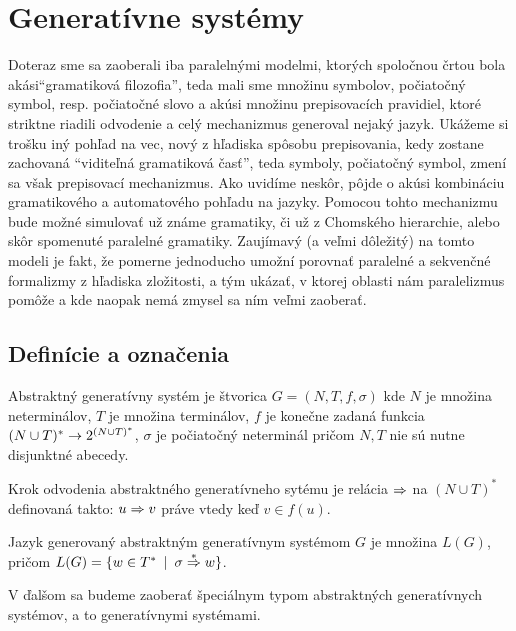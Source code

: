 \chapter{Generatívne systémy}

Doteraz sme sa zaoberali iba paralelnými modelmi, ktorých
spoločnou črtou bola akási\linebreak ``gramatiková filozofia'',
teda mali sme množinu symbolov, počiatočný symbol, resp.
počiatočné slovo a akúsi množinu prepisovacích pravidiel, ktoré
striktne riadili odvodenie a celý mechanizmus generoval nejaký
jazyk. Ukážeme si trošku iný pohľad na vec, nový z hľadiska
spôsobu prepisovania, kedy zostane zachovaná ``viditeľná
gramatiková časť'', teda symboly, počiatočný symbol, zmení sa však
prepisovací mechanizmus. Ako uvidíme neskôr, pôjde o akúsi
kombináciu gramatikového a automatového pohľadu na jazyky. Pomocou
tohto mechanizmu bude možné simulovať už známe gramatiky, či už z
Chomského hierarchie, alebo skôr spomenuté paralelné gramatiky.
Zaujímavý (a veľmi dôležitý) na tomto modeli je fakt, že pomerne
jednoducho umožní porovnať paralelné a sekvenčné formalizmy z
hľadiska zložitosti, a tým ukázať, v ktorej oblasti nám
paralelizmus pomôže a kde naopak nemá zmysel sa ním veľmi
zaoberať.

\section{Definície a označenia}

\begin{definicia}
  Abstraktný generatívny systém je štvorica $G=(N,T,f,\sigma)$ kde
  $N$ je množina neterminálov, $T$ je množina terminálov, $f$ je
  konečne zadaná funkcia $(N\cup T)^* \rightarrow 2^{(N\cup T)^* }$,
  $\sigma$ je počiatočný neterminál pričom $N,T$ nie sú nutne
  disjunktné abecedy.
\end{definicia}

\begin{definicia}
  Krok odvodenia abstraktného generatívneho sytému je relácia $\Rightarrow$
  na $(N\cup T)^* $ definovaná takto: $u\Rightarrow v$ práve vtedy keď $v\in
  f(u)$.
\end{definicia}

\begin{definicia}
  Jazyk generovaný abstraktným generatívnym systémom $G$ je množina
  $L(G)$, pričom \mbox{$L(G)=\{w\in T^* \enspace |\enspace\sigma\overset{* }{\Rightarrow}
  w\}$}.
\end{definicia}

V ďalšom sa budeme zaoberať špeciálnym typom abstraktných
generatívnych systémov, a to generatívnymi systémami.

